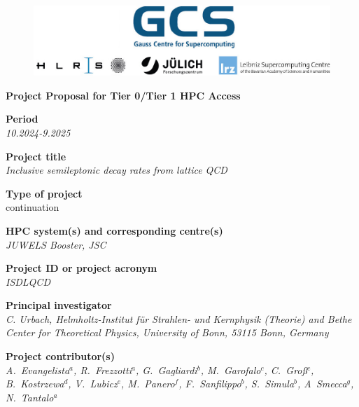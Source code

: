 \documentclass [a4paper, 11pt]{article}
\begin{document}
 
\begin{figure}[H]
\begin{center}
  \includegraphics[scale=0.45]{Figures/GCS-hlrs-fzj-lrz.jpg}\\
\end{center}
\end{figure}

\begin{center}
{\LARGE \bf Project Proposal for Tier 0/Tier 1 HPC Access} \\

\bigskip
\bigskip
\bigskip
\end{center}
\textbf{Period}\\
\phantom{MM}\textit{10.2024-9.2025}

\bigskip
\textbf{Project title}\\
\phantom{MM}\textit{Inclusive semileptonic decay rates from lattice QCD}

\bigskip
\textbf{Type of project}\\
\phantom{MM} continuation

\bigskip
\textbf{HPC system(s) and corresponding centre(s)}\\
\phantom{MM} \textit{JUWELS Booster, JSC}

\bigskip
\textbf{Project ID or project acronym}\\
\phantom{MM} \textit{ISDLQCD}%

\bigskip
\textbf{Principal investigator}\\
\phantom{MM} \textit{C. Urbach, Helmholtz-Institut für Strahlen- und Kernphysik (Theorie) and
	Bethe Center for Theoretical Physics, University of Bonn, 53115 Bonn, Germany}

\bigskip
\textbf{Project contributor(s)}\\
\phantom{MM} \textit{ 
 A.~Evangelista$^a$,
 R.~Frezzotti$^a$,
 G.~Gagliardi$^b$,
 M.~Garofalo$^c$,
 C.~Groß$^c$,
 B.~Kostrzewa$^d$,
 V.~Lubicz$^e$,
 M.~Panero$^f$,
 F.~Sanfilippo$^b$,
 S.~Simula$^b$,
 A~Smecca$^g$,
 N.~Tantalo$^a$
}\\ 
\end{document}
